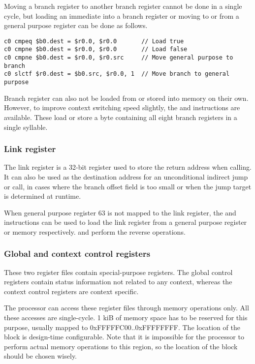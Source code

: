 Moving a branch register to another branch register cannot be done in a single
cycle, but loading an immediate into a branch register or moving to or from a
general purpose register can be done as follows.

\begin{lstlisting}[numbers=none, basicstyle=\footnotesize, language=vexasm]
c0 cmpeq $b0.dest = $r0.0, $r0.0       // Load true
c0 cmpne $b0.dest = $r0.0, $r0.0       // Load false
c0 cmpne $b0.dest = $r0.0, $r0.src     // Move general purpose to branch
c0 slctf $r0.dest = $b0.src, $r0.0, 1  // Move branch to general purpose
\end{lstlisting}

Branch register can also not be loaded from or stored into memory on their own.
However, to improve context switching speed slightly, the  and
 instructions are available. These load or store a byte containing
all eight branch registers in a single syllable.

\subsubsection{Link register}
\label{sec:core-ug-isa-regs-lr}

The link register is a 32-bit register used to store the return address when
calling. It can also be used as the destination address for an unconditional
indirect jump or call, in cases where the branch offset field is too small or
when the jump target is determined at runtime.

When general purpose register 63 is not mapped to the link register, the 
 and  instructions can be used to load the link register 
from a general purpose register or memory respectively.  and 
 perform the reverse operations.

\subsubsection{Global and context control registers}
\label{sec:core-ug-isa-regs-creg}

These two register files contain special-purpose registers. The global control
registers contain status information not related to any context, whereas the
context control registers are context specific.

The processor can access these register files through memory operations only. 
All these accesses are single-cycle. 1 kiB of memory space has to be reserved 
for this purpose, usually mapped to 0xFFFFFC00..0xFFFFFFFF. The location of the 
block is design-time configurable. Note that it is impossible for the processor 
to perform actual memory operations to this region, so the location of the block 
should be chosen wisely.

